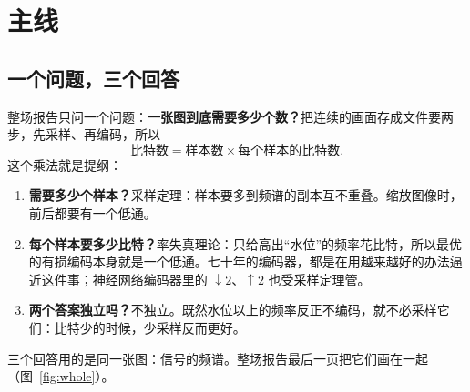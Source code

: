 \usetikzlibrary{arrows.meta,positioning,calc,decorations.pathreplacing}
\pgfplotsset{compat=1.18}
\newcommand{\sinc}{\operatorname{sinc}}

\begin{abstract}
这是幻灯片 \href{https://mejistus.github.io/\#post=Slides/From-Samples-to-Bits.tex}{From Samples to Bits} 的讲稿。
\textbf{第~\ref{sec:line}~节}是主线：整场只有一个问题、三个回答，以及每一页回答了什么、又引出了什么。
\textbf{第~\ref{sec:script}~节}是逐页讲词，连起来读就是一整场报告：每页第一句接住上一页的问题，最后一句抛出下一页的问题。
\textbf{第~\ref{sec:bg}~节}是背景知识，顺序与幻灯片一致，用来理解和应付追问；\textbf{第~\ref{sec:qa}~节}是提问准备。
建议的准备顺序：先读主线，直到能不看稿说出那张递进表；再把讲词读出声两遍；背景知识第一次通读，之后只在需要时翻。
\end{abstract}

\section{主线}\label{sec:line}

\subsection{一个问题，三个回答}
整场报告只问一个问题：\textbf{一张图到底需要多少个数？}把连续的画面存成文件要两步，先采样、再编码，所以
\[
\text{比特数}=\text{样本数}\times\text{每个样本的比特数}.
\]
这个乘法就是提纲：
\begin{enumerate}
  \item \textbf{需要多少个样本？}采样定理：样本要多到频谱的副本互不重叠。缩放图像时，前后都要有一个低通。
  \item \textbf{每个样本要多少比特？}率失真理论：只给高出“水位”的频率花比特，所以最优的有损编码本身就是一个低通。七十年的编码器，都是在用越来越好的办法逼近这件事；神经网络编码器里的 $\downarrow2$、$\uparrow2$ 也受采样定理管。
  \item \textbf{两个答案独立吗？}不独立。既然水位以上的频率反正不编码，就不必采样它们：比特少的时候，少采样反而更好。
\end{enumerate}
三个回答用的是同一张图：信号的频谱。整场报告最后一页把它们画在一起（图~\ref{fig:whole}）。

